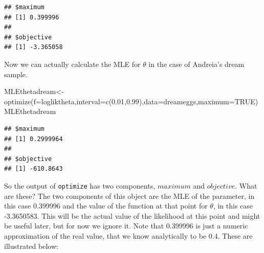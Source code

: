 \documentclass[
]{book}
\newenvironment{Shaded}{\begin{snugshade}}{\end{snugshade}}
\newcommand{\AttributeTok}[1]{\textcolor[rgb]{0.77,0.63,0.00}{#1}}
\newcommand{\CommentTok}[1]{\textcolor[rgb]{0.56,0.35,0.01}{\textit{#1}}}
\newcommand{\ConstantTok}[1]{\textcolor[rgb]{0.00,0.00,0.00}{#1}}
\newcommand{\ControlFlowTok}[1]{\textcolor[rgb]{0.13,0.29,0.53}{\textbf{#1}}}
\newcommand{\DecValTok}[1]{\textcolor[rgb]{0.00,0.00,0.81}{#1}}
\newcommand{\FloatTok}[1]{\textcolor[rgb]{0.00,0.00,0.81}{#1}}
\newcommand{\FunctionTok}[1]{\textcolor[rgb]{0.00,0.00,0.00}{#1}}
\newcommand{\NormalTok}[1]{#1}
\newcommand{\OtherTok}[1]{\textcolor[rgb]{0.56,0.35,0.01}{#1}}
\newcommand{\SpecialCharTok}[1]{\textcolor[rgb]{0.00,0.00,0.00}{#1}}
\newcommand{\StringTok}[1]{\textcolor[rgb]{0.31,0.60,0.02}{#1}}
\begin{document}
\begin{verbatim}
## $maximum
## [1] 0.399996
## 
## $objective
## [1] -3.365058
\end{verbatim}

Now we can actually calculate the MLE for \(\theta\) in the case of Andreia's dream sample.

\begin{Shaded}
\begin{Highlighting}[]
\NormalTok{MLEthetadream}\OtherTok{\textless{}{-}}\FunctionTok{optimize}\NormalTok{(}\AttributeTok{f=}\NormalTok{logliktheta,}\AttributeTok{interval=}\FunctionTok{c}\NormalTok{(}\FloatTok{0.01}\NormalTok{,}\FloatTok{0.99}\NormalTok{),}\AttributeTok{data=}\NormalTok{dreameggs,}\AttributeTok{maximum=}\ConstantTok{TRUE}\NormalTok{)}
\NormalTok{MLEthetadream}
\end{Highlighting}
\end{Shaded}

\begin{verbatim}
## $maximum
## [1] 0.2999964
## 
## $objective
## [1] -610.8643
\end{verbatim}

So the output of \texttt{optimize} has two components, \(maximum\) and \(objective\). What are these?
The two components of this object are the MLE of the parameter, in this case 0.399996 and the value of the function at that point for \(\theta\), in this case -3.3650583. This will be the actual value of the likelihood at this point and might be useful later, but for now we ignore it. Note that 0.399996 is just a numeric approximation of the real value, that we know analytically to be 0.4. These are illustrated below:

\begin{Shaded}
\end{Shaded}
\end{document}

